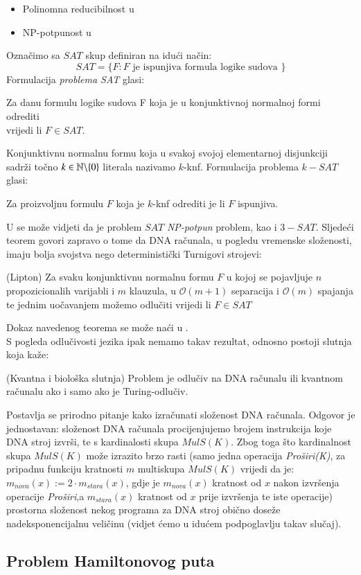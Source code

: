 \documentclass[a4paper,oneside,12pt]{memoir} %
\begin{document}
\begin{spacing}{1.5}
\begin{itemize}
 	\item Polinomna reducibilnost u \cite[s. ~272]{Sipser}
 	\item NP-potpunost u \cite[s. ~276]{Sipser}
\end{itemize}
Označimo sa $SAT$ skup definiran na idući način:
\[SAT=\{F: F \textrm{ je ispunjiva formula logike sudova }\}\]
Formulacija \textit{problema SAT} glasi:\\
\begin{center}
Za danu formulu logike sudova F koja je u konjunktivnoj normalnoj formi odrediti\\ vrijedi li $F \in  SAT$.
\end{center}
Konjunktivnu normalnu formu koja u svakoj svojoj elementarnoj disjunkciji sadrži točno $k \in \mathbb{N} \backslash \{0\}$ literala nazivamo $k$-knf. Formulacija problema $k-SAT$ glasi:
\begin{center}
	Za proizvoljnu formulu $F$ koja je $k$-knf odrediti je li $F$ ispunjiva. 
\end{center} 
U \cite[s. ~276-283]{Sipser} se može vidjeti da je problem $SAT$ \textit{NP-potpun} problem, kao i $3-SAT$.
Sljedeći teorem govori zapravo o tome da DNA računala, u pogledu vremenske složenosti, imaju bolja svojstva nego deterministički Turnigovi strojevi:
\begin{thm} (Lipton)
Za svaku konjunktivnu normalnu formu $F$ u kojoj se pojavljuje $n$ propozicionalih varijabli i $m$ klauzula, u $\mathcal{O}(m+1)$ separacija i $\mathcal{O}(m)$ spajanja te jednim uočavanjem možemo odlučiti vrijedi li $F \in SAT$
\end{thm}
Dokaz navedenog teorema se može naći u \cite{Lipton}.\\
S pogleda odlučivosti jezika ipak nemamo takav rezultat, odnosno postoji slutnja koja kaže:
\begin{conj} (Kvantna i biološka slutnja) Problem je odlučiv na DNA računalu ili kvantnom računalu ako i samo ako je Turing-odlučiv.
\end{conj}
Postavlja se prirodno pitanje kako izračunati složenost DNA računala. Odgovor je jednostavan: složenost DNA računala procijenjujemo brojem instrukcija koje DNA stroj izvrši, te s kardinalosti skupa $MulS(K)$. Zbog toga što kardinalnost skupa $MulS(K)$ može izrazito brzo rasti (samo jedna operacija \textit{Proširi(K)}, za pripadnu funkciju kratnosti $m$ multiskupa $MulS(K)$ vrijedi da je: $m_{nova}(x):=2\cdot m_{stara}(x)$, gdje je $m_{nova}(x)$ kratnost od $x$ nakon izvršenja operacije \textit{Proširi},a $m_{stara}(x)$ kratnost od $x$ prije izvršenja te iste operacije) prostorna složenost nekog programa za DNA stroj obično doseže nadeksponencijalnu veličinu (vidjet ćemo u idućem podpoglavlju takav slučaj).  
\subsection{Problem Hamiltonovog puta}
\newpage
\nocite{*}


\end{spacing}
\end{document}

